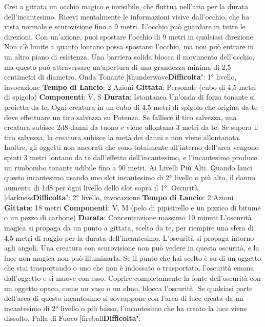 \begin{multicols}{2}
Crei a gittata un occhio magico e invisibile, che fluttua
nell’aria per la durata dell’incantesimo.
Ricevi mentalmente le informazioni visive dall’occhio,
che ha vista normale e scurovisione fino a 9 metri.
L’occhio può guardare in tutte le direzioni.
Con un’azione, puoi spostare l’occhio di 9 metri in
qualsiasi direzione. Non c’è limite a quanto lontano
possa spostarsi l’occhio, ma non può entrare in un altro
piano di esistenza. Una barriera solida blocca il
movimento dell’occhio, ma questo può attraversare
un’apertura di una grandezza minima di 2,5 centimetri
di diametro.
Onda Tonante
[thunderwave\textbf{Difficolta'}:
1° livello, invocazione
\textbf{Tempo di Lancio}: 2 Azioni
\textbf{Gittata}: Personale (cubo di 4,5 metri di spigolo)
\textbf{Componenti}: V, S
\textbf{Durata}: Istantanea
Un’onda di forza tonante si proietta da te. Ogni creatura
in un cubo di 4,5 metri di spigolo che origina da te deve
effettuare un tiro salvezza su Potenza. Se fallisce il
tiro salvezza, una creatura subisce 2d8 danni da tuono
e viene allontana 3 metri da te. Se supera il tiro
salvezza, la creatura subisce la metà dei danni e non
viene allontanata.
Inoltre, gli oggetti non ancorati che sono totalmente
all’interno dell’area vengono spinti 3 metri lontano da te
dall’effetto dell’incantesimo, e l’incantesimo produce un
rimbombo tonante udibile fino a 90 metri.
Ai Livelli Più Alti. Quando lanci questo incantesimo
usando uno slot incantesimo di 2° livello o più alto, il
danno aumenta di 1d8 per ogni livello dello slot sopra il
1°.
Oscurità
[darkness\textbf{Difficolta'}:
2° livello, invocazione
\textbf{Tempo di Lancio}: 2 Azioni
\textbf{Gittata}: 18 metri
\textbf{Componenti}: V, M (pelo di pipistrello e un pizzico di
bitume o un pezzo di carbone)
\textbf{Durata}: Concentrazione massimo 10 minuti
L’oscurità magica si propaga da un punto a gittata,
scelto da te, per riempire una sfera di 4,5 metri di raggio
per la durata dell’incantesimo. L’oscurità si propaga
intorno agli angoli. Una creatura con scurovisione non
può vedere in questa oscurità, e la luce non magica non
può illuminarla.
Se il punto che hai scelto è su di un oggetto che stai
trasportando o uno che non è indossato o trasportato,
l’oscurità emana dall’oggetto e si muove con esso.
Coprire completamente la fonte dell’oscurità con un
oggetto opaco, come un vaso o un elmo, blocca
l’oscurità.
Se qualsiasi parte dell’area di questo incantesimo si
sovrappone con l’area di luce creata da un incantesimo
di 2° livello o più basso, l’incantesimo che ha creato la
luce viene dissolto.
Palla di Fuoco
[fireball\textbf{Difficolta'}:

\end{multicols}
